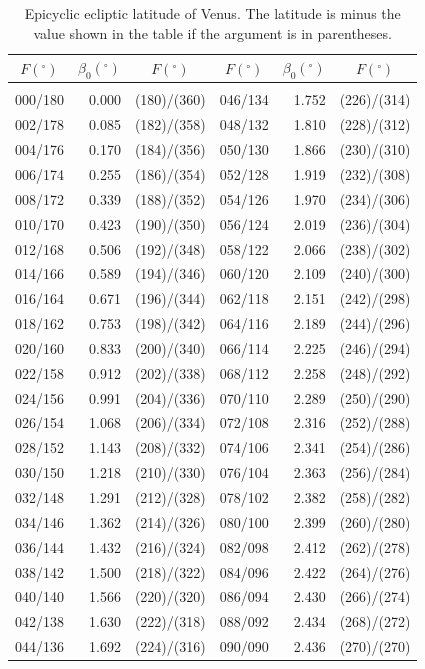 \clearpage
\begin{table}[!h]\centering
\vspace{0.25cm}
{ \begin{tabular}{crc|crc}
$F (^\circ)$ & $\beta_0(^\circ)$ &$F (^\circ)$ &$F (^\circ)$ & $\beta_0(^\circ)$ & $F (^\circ)$  \\\hline
&&\\[-1.75ex]
000/180 &  0.000 & (180)/(360)&046/134 &  1.752 & (226)/(314)\\
002/178 &  0.085 & (182)/(358)&048/132 &  1.810 & (228)/(312)\\
004/176 &  0.170 & (184)/(356)&050/130 &  1.866 & (230)/(310)\\
006/174 &  0.255 & (186)/(354)&052/128 &  1.919 & (232)/(308)\\
008/172 &  0.339 & (188)/(352)&054/126 &  1.970 & (234)/(306)\\
010/170 &  0.423 & (190)/(350)&056/124 &  2.019 & (236)/(304)\\
012/168 &  0.506 & (192)/(348)&058/122 &  2.066 & (238)/(302)\\
014/166 &  0.589 & (194)/(346)&060/120 &  2.109 & (240)/(300)\\
016/164 &  0.671 & (196)/(344)&062/118 &  2.151 & (242)/(298)\\
018/162 &  0.753 & (198)/(342)&064/116 &  2.189 & (244)/(296)\\
020/160 &  0.833 & (200)/(340)&066/114 &  2.225 & (246)/(294)\\
022/158 &  0.912 & (202)/(338)&068/112 &  2.258 & (248)/(292)\\
024/156 &  0.991 & (204)/(336)&070/110 &  2.289 & (250)/(290)\\
026/154 &  1.068 & (206)/(334)&072/108 &  2.316 & (252)/(288)\\
028/152 &  1.143 & (208)/(332)&074/106 &  2.341 & (254)/(286)\\
030/150 &  1.218 & (210)/(330)&076/104 &  2.363 & (256)/(284)\\
032/148 &  1.291 & (212)/(328)&078/102 &  2.382 & (258)/(282)\\
034/146 &  1.362 & (214)/(326)&080/100 &  2.399 & (260)/(280)\\
036/144 &  1.432 & (216)/(324)&082/098 &  2.412 & (262)/(278)\\
038/142 &  1.500 & (218)/(322)&084/096 &  2.422 & (264)/(276)\\
040/140 &  1.566 & (220)/(320)&086/094 &  2.430 & (266)/(274)\\
042/138 &  1.630 & (222)/(318)&088/092 &  2.434 & (268)/(272)\\
044/136 &  1.692 & (224)/(316)&090/090 &  2.436 & (270)/(270)\\
\end{tabular}}
\caption{Epicyclic ecliptic latitude of Venus.  The latitude is minus the value shown
in the table if the argument is
in parentheses. }\label{tlat1v}
\end{table}

